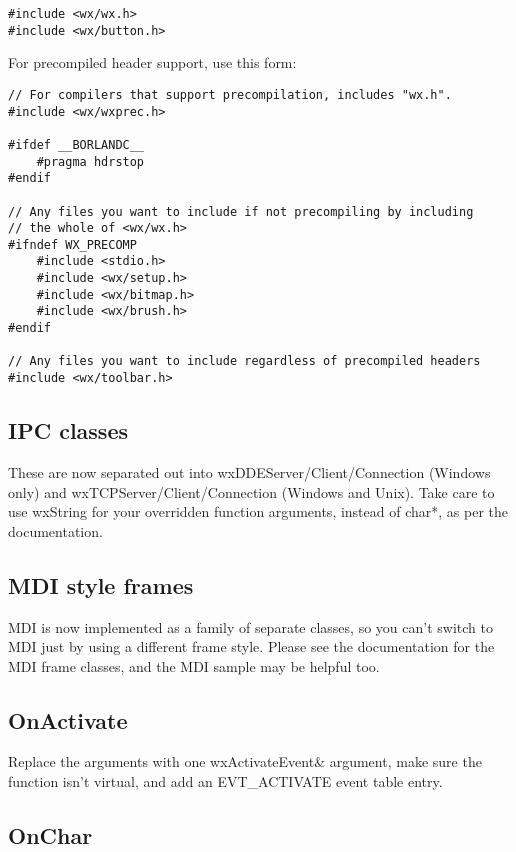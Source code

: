 \begin{verbatim}
#include <wx/wx.h>
#include <wx/button.h>
\end{verbatim}

For precompiled header support, use this form:

\begin{verbatim}
// For compilers that support precompilation, includes "wx.h".
#include <wx/wxprec.h>

#ifdef __BORLANDC__
    #pragma hdrstop
#endif

// Any files you want to include if not precompiling by including
// the whole of <wx/wx.h>
#ifndef WX_PRECOMP
    #include <stdio.h>
    #include <wx/setup.h>
    #include <wx/bitmap.h>
    #include <wx/brush.h>
#endif

// Any files you want to include regardless of precompiled headers
#include <wx/toolbar.h>
\end{verbatim}

\subsection{IPC classes}

These are now separated out into wxDDEServer/Client/Connection (Windows only) and wxTCPServer/Client/Connection
(Windows and Unix). Take care to use wxString for your overridden function arguments, instead of char*, as per
the documentation.

\subsection{MDI style frames}

MDI is now implemented as a family of separate classes, so you can't switch to MDI just by
using a different frame style. Please see the documentation for the MDI frame classes, and the MDI
sample may be helpful too.

\subsection{OnActivate}

Replace the arguments with one wxActivateEvent\& argument, make sure the function isn't virtual,
and add an EVT\_ACTIVATE event table entry.

\subsection{OnChar}

